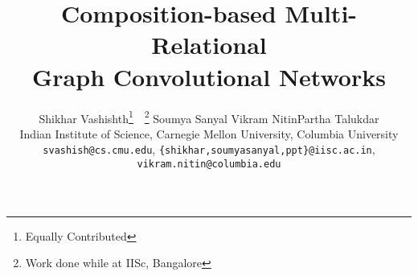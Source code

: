 \documentclass{article} \usepackage{iclr2020_conference,times}
\title{Composition-based Multi-Relational \\ Graph Convolutional Networks}
\author{Shikhar Vashishth\thanks{Equally Contributed}~~\thanks{Work done while at IISc, Bangalore} \quad Soumya Sanyal \quad Vikram Nitin\footnotemark[2] \quad Partha Talukdar\\
	Indian Institute of Science, Carnegie Mellon University, Columbia University\\
	\small \texttt{svashish@cs.cmu.edu}, \small  \texttt{\{shikhar,soumyasanyal,ppt\}@iisc.ac.in}, \\ \small \texttt{vikram.nitin@columbia.edu}
}
\begin{document}
\newcommand{\refalg}[1]{Algorithm \ref{#1}}
\newcommand{\refeqn}[1]{Equation \ref{#1}}
\newcommand{\reffig}[1]{Figure \ref{#1}}
\newcommand{\reftbl}[1]{Table \ref{#1}}
\newcommand{\refsec}[1]{Section \ref{#1}}





\newcommand{\add}[1]{\textcolor{red}{#1}\typeout{#1}}
\newcommand{\remove}[1]{\sout{#1}\typeout{#1}}

\newcommand{\m}[1]{\mathcal{#1}}
\newcommand{\bmm}[1]{\bm{\mathcal{#1}}}
\newcommand{\real}[1]{\mathbb{R}^{#1}}
\newcommand{\method}{\textsc{CompGCN}}

\newcommand{\bleuone}{BLEU\xspace}
\newcommand{\bleu}{BLEU\xspace}

\newcommand{\problem}{DD}
\newcommand{\problemfull}{Document Dating}

\newtheorem{theorem}{Theorem}[section]
\newtheorem{claim}[theorem]{Claim}

\newcommand{\reminder}[1]{\textcolor{red}{[[ #1 ]]}\typeout{#1}}
\newcommand{\reminderR}[1]{\textcolor{gray}{[[ #1 ]]}\typeout{#1}}


\newcommand{\tensor}{\mathcal{X}}
\newcommand{\Real}{\mathbb{R}}

\newcommand{\tuples}{\mathbb{T}}

\newcommand\norm[1]{\left\lVert#1\right\rVert}

\newcommand{\note}[1]{\textcolor{blue}{#1}}

\newcommand*{\Scale}[2][4]{\scalebox{#1}{}}\newcommand*{\Resize}[2]{\resizebox{#1}{!}{}}

\def\mat#1{\mbox{\bf #1}}

\newcommand{\datafb}{FB15k}
\newcommand{\datawn}{WN18}
\newcommand{\datafbn}{FB15k-237}
\newcommand{\datawnn}{WN18RR}
\newcommand{\datayago}{YAGO3-10}

\theoremstyle{definition}
\newtheorem{definition}{Definition}[section]
 
\theoremstyle{proposition}
\newtheorem{proposition}{Proposition}[section]
\newtheorem*{lemma*}{Lemma}

 
\maketitle
\end{document}
